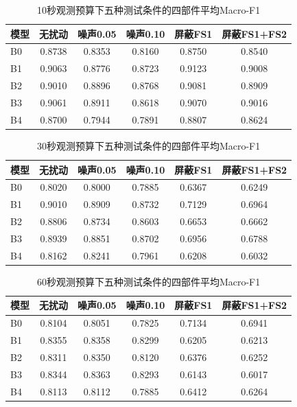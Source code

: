 \documentclass[12pt, a4paper]{ctexart}
\begin{document}
\begin{table}[H]
    \centering
    \caption{10秒观测预算下五种测试条件的四部件平均Macro-F1}
    \label{tab:robust_10s}
    \small
    \begin{tabular}{lccccc}
        \toprule
        \textbf{模型} & \textbf{无扰动} & \textbf{噪声0.05} & \textbf{噪声0.10} & \textbf{屏蔽FS1} & \textbf{屏蔽FS1+FS2} \\
        \midrule
        B0 & 0.8738 & 0.8353 & 0.8160 & 0.8750 & 0.8540 \\
        B1 & 0.9063 & 0.8776 & 0.8723 & 0.9123 & 0.9008 \\
        B2 & 0.9010 & 0.8896 & 0.8768 & 0.9081 & 0.8909 \\
        B3 & 0.9061 & 0.8911 & 0.8618 & 0.9070 & 0.9016 \\
        B4 & 0.8700 & 0.7944 & 0.7891 & 0.8807 & 0.8624 \\
        \bottomrule
    \end{tabular}
\end{table}
\begin{table}[H]
    \centering
    \caption{30秒观测预算下五种测试条件的四部件平均Macro-F1}
    \label{tab:robust_30s}
    \small
    \begin{tabular}{lccccc}
        \toprule
        \textbf{模型} & \textbf{无扰动} & \textbf{噪声0.05} & \textbf{噪声0.10} & \textbf{屏蔽FS1} & \textbf{屏蔽FS1+FS2} \\
        \midrule
        B0 & 0.8020 & 0.8000 & 0.7885 & 0.6367 & 0.6249 \\
        B1 & 0.9010 & 0.8909 & 0.8732 & 0.7129 & 0.6964 \\
        B2 & 0.8806 & 0.8734 & 0.8603 & 0.6653 & 0.6662 \\
        B3 & 0.8939 & 0.8851 & 0.8702 & 0.6956 & 0.6788 \\
        B4 & 0.8162 & 0.8241 & 0.7961 & 0.6208 & 0.6032 \\
        \bottomrule
    \end{tabular}
\end{table}
\begin{table}[H]
    \centering
    \caption{60秒观测预算下五种测试条件的四部件平均Macro-F1}
    \label{tab:robust_60s}
    \small
    \begin{tabular}{lccccc}
        \toprule
        \textbf{模型} & \textbf{无扰动} & \textbf{噪声0.05} & \textbf{噪声0.10} & \textbf{屏蔽FS1} & \textbf{屏蔽FS1+FS2} \\
        \midrule
        B0 & 0.8104 & 0.8051 & 0.7825 & 0.7134 & 0.6941 \\
        B1 & 0.8355 & 0.8358 & 0.8299 & 0.6205 & 0.6213 \\
        B2 & 0.8311 & 0.8350 & 0.8120 & 0.6376 & 0.6252 \\
        B3 & 0.8344 & 0.8363 & 0.8293 & 0.6143 & 0.6017 \\
        B4 & 0.8113 & 0.8112 & 0.7885 & 0.6412 & 0.6264 \\
        \bottomrule
    \end{tabular}
\end{table}
\end{document}
